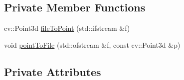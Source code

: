 \subsection*{Private Member Functions}
\begin{DoxyCompactItemize}
\item 
cv\+::\+Point3d \hyperlink{class_face3_d_1_1_face_geometry_a3cf141b264a03ac4c80d39596528afb7}{file\+To\+Point} (std\+::ifstream \&f)
\item 
void \hyperlink{class_face3_d_1_1_face_geometry_adfb84290b1363a7f37c785640464bc42}{point\+To\+File} (std\+::ofstream \&f, const cv\+::\+Point3d \&p)
\end{DoxyCompactItemize}
\subsection*{Private Attributes}
